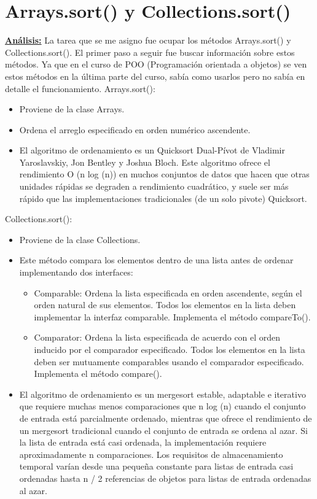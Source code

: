 \documentclass[12pt,letterpaper]{article}
\begin{document}
\section{Arrays.sort() y Collections.sort()}
\vskip 0.4cm
{\bf\underline {Análisis:}} La tarea que se me asigno fue ocupar los métodos Arrays.sort() y Collections.sort().
 El primer paso a seguir fue buscar información sobre estos métodos. Ya que en el curso de POO (Programación orientada a objetos) se ven estos métodos en la última parte del curso, sabía como usarlos pero no sabía en detalle el funcionamiento.
 \vskip 0.4cm
Arrays.sort():
\vskip 0.4cm
\begin{itemize}
\item Proviene de la clase Arrays.
\item Ordena el arreglo especificado en orden numérico ascendente.
\item El algoritmo de ordenamiento es un Quicksort Dual-Pívot de Vladimir Yaroslavskiy, Jon Bentley y Joshua Bloch. Este algoritmo ofrece el rendimiento O (n log (n)) en muchos conjuntos de datos que hacen que otras unidades rápidas se degraden a rendimiento cuadrático, y suele ser más rápido que las implementaciones tradicionales (de un solo pivote) Quicksort.
\end{itemize}
\vskip 0.4cm
Collections.sort():
\vskip 0.4cm
\begin{itemize}
\item Proviene de la clase Collections.
\item Este método compara los elementos dentro de una lista antes de ordenar implementando dos interfaces:
\begin{itemize}
\item Comparable: Ordena la lista especificada en orden ascendente, según el orden natural de sus elementos. Todos los elementos en la lista deben implementar la interfaz comparable. Implementa el método compareTo().
\item Comparator: Ordena la lista especificada de acuerdo con el orden inducido por el comparador especificado. Todos los elementos en la lista deben ser mutuamente comparables usando el comparador especificado. Implementa el método compare().
\end{itemize}
\item El algoritmo de ordenamiento es un mergesort estable, adaptable e iterativo que requiere muchas menos comparaciones que n log (n) cuando el conjunto de entrada está parcialmente ordenado, mientras que ofrece el rendimiento de un mergesort tradicional cuando el conjunto de entrada se ordena al azar. Si la lista de entrada está casi ordenada, la implementación requiere aproximadamente n comparaciones. Los requisitos de almacenamiento temporal varían desde una
pequeña constante para listas de entrada casi ordenadas hasta n / 2 referencias de
objetos para listas de entrada ordenadas al azar.
\end{itemize}
\end{document}
